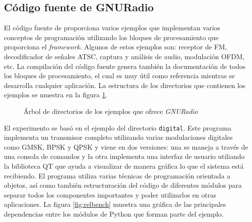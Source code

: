 \subsection{C\'odigo fuente de GNURadio}
El c\'odigo fuente de \gnuradio proporciona varios ejemplos que implementan varios conceptos de programaci\'on
utilizando los bloques de procesamiento que proporciona el \emph{framework}. Algunos de estos
ejemplos son: receptor de FM, decodificador de se\~nales ATSC, captura y an\'alisis de audio,
modulaci\'on OFDM, etc. La compilaci\'on del c\'odigo fuente genera tambi\'en la documentaci\'on de todos
los bloques de procesamiento, el cual es muy \'util como referencia mientras se desarrolla cualquier
aplicaci\'on. La estructura de los directorios que contienen los ejemplos se muestra en la figura
\ref{fig:extree}.

\begin{figure}[ht]
\DTsetlength{1.5em}{1em}{0.2em}{0.4pt}{1.6pt} %
	\vspace{0.5in}
	\caption{\'Arbol de directorios de los ejemplos que ofrece \emph{GNURadio}}
	\label{fig:extree}
\end{figure}

El experimento se bas\'o en el ejemplo del directorio \verb|digital|. Este programa implementa un
transmisor completo utilizando varias modulaciones digitales como GMSK, BPSK y QPSK y viene en dos
versiones: una se maneja a trav\'es de una consola de comandos y la otra implementa una interfaz de
usuario utiliando la biblioteca QT que ayuda a visualizar de manera gr\'afica lo que el sistema est\'a
recibiendo. El programa utiliza varias t\'ecnicas de programaci\'on orientada a objetos, as\'i como
tambi\'en estructuraci\'on del c\'odigo de diferentes m\'odulos para separar todos los componentes
importantes y poder utilizarlos en otras aplicaciones. La figura \ref{fig:relbench} muestra una gr\'afica
de las principales dependencias entre los m\'odulos de Python que forman parte del ejemplo.

